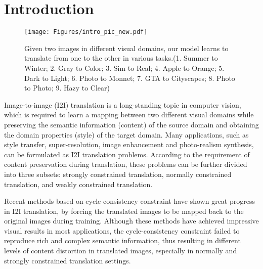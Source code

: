 \documentclass[runningheads]{llncs}
\begin{document}
\section{Introduction}
\label{sec:intro}
\begin{figure}
\centering
    \texttt{[image: Figures/intro\_pic\_new.pdf]}
\caption{Given two images in different visual domains, our model learns to translate from one to the other in various tasks.(1. Summer to Winter\cite{zhu2017unpaired}; 2. Gray to Color\cite{anwar2020image}; 3. Sim to Real\cite{zia2021surgical}; 4. Apple to Orange\cite{zhu2017unpaired}; 5. Dark to Light\cite{wei2018deep}; 6. Photo to Monnet\cite{wikiart}; 7. GTA\cite{richter2016playing} to Cityscapes\cite{cordts2016cityscapes}; 8. Photo to Photo\cite{luan2017deep}; 9. Hazy to Clear\cite{Dense-Haze_2019,NTIRE_Dehazing_2019})}
    \label{fig:various_results}
\end{figure}

Image-to-image (I2I) translation\cite{isola2017image} is a long-standing topic in computer vision, which is required to learn a mapping between two different visual domains while preserving the semantic information (content) of the source domain and obtaining the domain properties (style) of the target domain. Many applications, such as style transfer\cite{gatys2015texture,Gatys_2016_CVPR,huang2017arbitrary,li2017universal}, super-resolution\cite{Ledig_2017_CVPR,Lai_2017_CVPR}, image enhancement\cite{lore2017llnet} and photo-realism synthesis\cite{Chen_2017_ICCV,Wang_2018_CVPR,richter2021enhancing}, can be formulated as I2I translation problems. According to the requirement of content preservation during translation, these problems can be further divided into three subsets: strongly constrained translation, normally constrained translation, and weakly constrained translation.

Recent methods\cite{zhu2017unpaired,huang2018multimodal,lee2018diverse} based on cycle-consistency constraint have shown great progress in I2I translation, by forcing the translated images to be mapped back to the original images during training. Although these methods have achieved impressive visual results in most applications, the cycle-consistency constraint failed to reproduce rich and complex semantic information, thus resulting in different levels of content distortion in translated images, especially in normally and strongly constrained translation settings.
\end{document}
